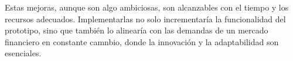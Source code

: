 Estas mejoras, aunque son algo ambiciosas, son alcanzables con el tiempo y los recursos adecuados. Implementarlas no solo incrementaría la funcionalidad del prototipo, sino que también lo alinearía con las demandas de un mercado financiero en constante camnbio, donde la innovación y la adaptabilidad son esenciales.
\vspace{0.5cm}